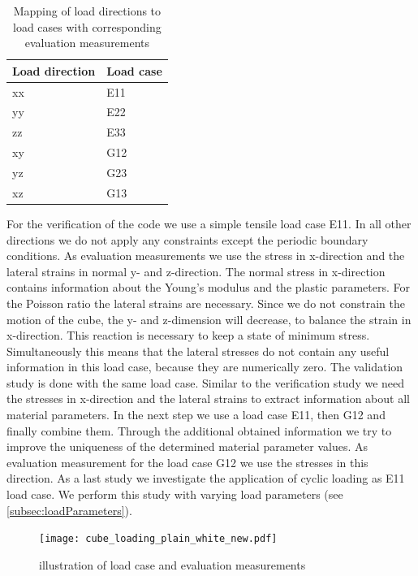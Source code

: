     \begin{table}[h!] 
    \label{tab:LoadCaseMapping}
    \centering
    \caption{Mapping of load directions to load cases with corresponding evaluation measurements}
    \renewcommand{\arraystretch}{1.1}
    \begin{tabular}{C{0.2\textwidth}C{0.15\textwidth}}
    \toprule
    \textbf{Load direction} & \textbf{Load case} \\ \midrule
    xx & E11 \\ \hline
    yy & E22 \\ \hline
    zz & E33  \\ \hline
    xy & G12 \\ \hline
    yz & G23 \\ \hline
    xz & G13 \\ \bottomrule
    \end{tabular}
    
    \end{table}

    For the verification of the code we use a simple tensile load case E11.
    In all other directions we do not apply any constraints except the periodic boundary conditions. As evaluation measurements we use the stress in x-direction and the lateral strains in normal y- and z-direction. The normal stress in x-direction contains information about the Young's modulus and the plastic parameters. For the Poisson ratio the lateral strains are necessary. Since we do not constrain the motion of the cube, the y- and z-dimension will decrease, to balance the strain in x-direction. This reaction is necessary to keep a state of minimum stress. Simultaneously this means that the lateral stresses do not contain any useful information in this load case, because they are numerically zero. 
    The validation study is done with the same load case. Similar to the verification study we need the stresses in x-direction and the lateral strains to extract information about all material parameters. 
    In the next step we use a load case E11, then G12 and finally combine them. Through the additional obtained information we try to improve the uniqueness of the determined material parameter values. As evaluation measurement for the load case G12 we use the stresses in this direction.
    As a last study we investigate the application of cyclic loading as E11 load case. We perform this study with varying load parameters (see \autoref{subsec:loadParameters}). 


    \begin{figure}
		\centering
        \texttt{[image: cube\_loading\_plain\_white\_new.pdf]}
		\caption{illustration of load case and evaluation measurements}
		\label{fig:evaluationMeasurements}
	\end{figure}

